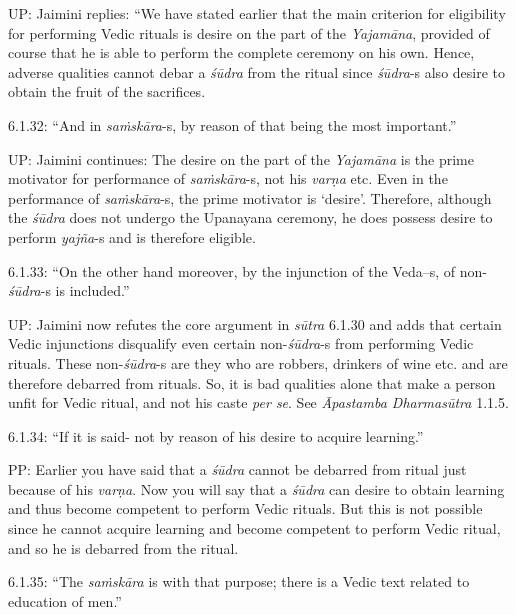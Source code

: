 UP: Jaimini replies: ``We have stated earlier that the main criterion for eligibility for performing Vedic rituals is desire on the part of the \textit{Yajamāna}, provided of course that he is able to perform the complete ceremony on his own. Hence, adverse qualities cannot debar a \textit{śūdra} from the ritual since \textit{śūdra}-s also desire to obtain the fruit of the sacrifices.

6.1.32: “And in \textit{saṁskāra}-s, by reason of that being the most important.”

UP: Jaimini continues: The desire on the part of the \textit{Yajamāna} is the prime motivator for performance of \textit{saṁskāra}-s, not his \textit{varṇa }etc. Even in the performance of \textit{saṁskāra}-s, the prime motivator is ‘desire’. Therefore, although the \textit{śūdra} does not undergo the Upanayana ceremony, he does possess desire to perform \textit{yajña}-s and is therefore eligible.

6.1.33: “On the other hand moreover, by the injunction of the Veda--s, of non-\textit{śūdra}-s is included.”

UP: Jaimini now refutes the core argument in \textit{sūtra} 6.1.30 and adds that certain Vedic injunctions disqualify even certain non-\textit{śūdra}-s from performing Vedic rituals. These non-\textit{śūdra}-s are they who are robbers, drinkers of wine etc. and are therefore debarred from rituals. So, it is bad qualities alone that make a person unfit for Vedic ritual, and not his caste \textit{per se}. See \textit{Āpastamba Dharmasūtra} 1.1.5.

6.1.34: “If it is said- not by reason of his desire to acquire learning.”

PP: Earlier you have said that a \textit{śūdra} cannot be debarred from ritual just because of his \textit{varṇa}. Now you will say that a \textit{śūdra} can desire to obtain learning and thus become competent to perform Vedic rituals. But this is not possible since he cannot acquire learning and become competent to perform Vedic ritual, and so he is debarred from the ritual.

6.1.35: “The \textit{saṁskāra} is with that purpose; there is a Vedic text related to education of men.”

